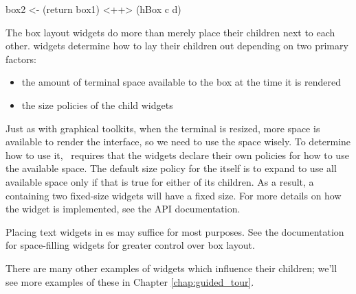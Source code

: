\begin{haskellcode}
 box2 <- (return box1) <++> (hBox c d)
\end{haskellcode}

The box layout widgets do more than merely place their children next
to each other.   widgets determine how to lay their children
out depending on two primary factors:

\begin{itemize}
\item the amount of terminal space available to the box at the time it
      is rendered
\item the size policies of the child widgets
\end{itemize}

Just as with graphical toolkits, when the terminal is resized, more
space is available to render the interface, so we need to use the
space wisely.  To determine how to use it, \vtyui\ requires that the
widgets declare their own policies for how to use the available space.
The default size policy for the  itself is to expand to use
all available space only if that is true for either of its children.
As a result, a  containing two fixed-size widgets will have a
fixed size.  For more details on how the  widget is
implemented, see the API documentation.

Placing text widgets in es may suffice for most purposes.  See
the documentation for space-filling widgets for greater control over
box layout.

There are many other examples of widgets which influence their
children; we'll see more examples of these in Chapter
\ref{chap:guided_tour}.
